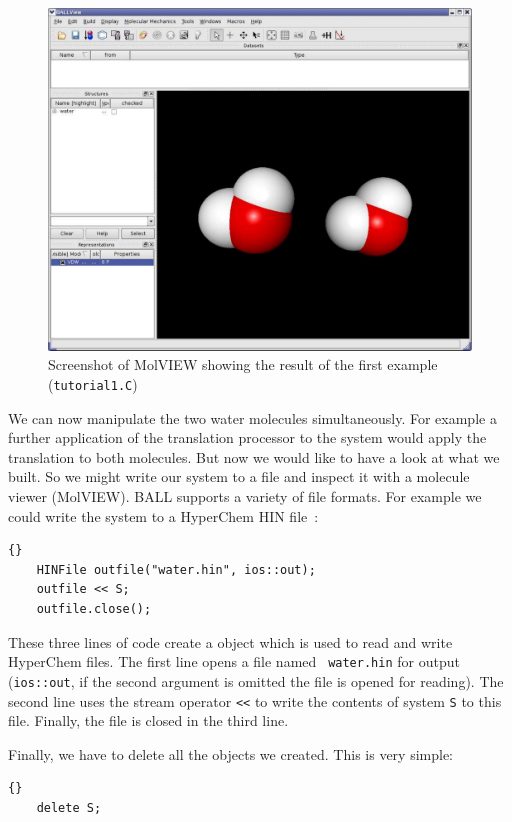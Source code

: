 \begin{figure}[t]
	\centering
	\includegraphics[width=\textwidth]{tut1_screenshot}
	\caption{Screenshot of MolVIEW showing the result of the first example
					 ({\tt tutorial1.C})}
	\label{fig:tut1-screenshot}
\end{figure}
\noindent
We can now manipulate the two water molecules simultaneously. For example a
further application of the translation processor to the system would apply
the translation to both molecules.
But now we would like to have a look at what we built. So we might write our
system to a file and inspect it with a molecule viewer (\eg MolVIEW).
BALL supports a variety of file formats. For example we could write the system
to a HyperChem HIN file~\cite{HyperChem}:
\begin{lstlisting}{}
	HINFile outfile("water.hin", ios::out);
	outfile << S;
	outfile.close();
\end{lstlisting}
\noindent
These three lines of code create a  object which is used to
read and write HyperChem files. The first line opens a file named {\tt
water.hin} for output ({\tt ios::out}, if the second argument is omitted the
file is opened for reading).
The second line uses the stream operator {\tt <<} to write the contents
of system {\tt S} to this file. Finally, the file is closed in the third line.

Finally, we have to delete all the objects we created. This is very simple:

\begin{lstlisting}{}
	delete S;
\end{lstlisting}

